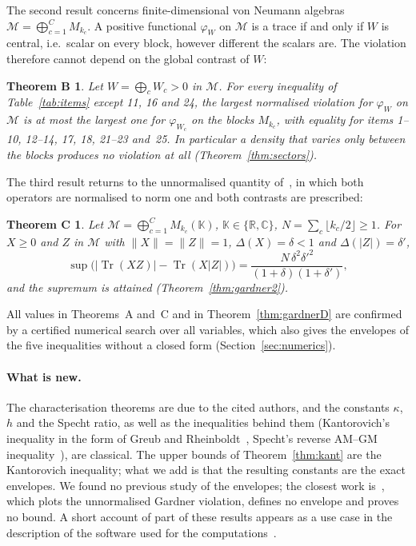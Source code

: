 \documentclass[11pt]{article}
\DeclareMathOperator{\Tr}{Tr}
\newcommand{\C}{\mathbb{C}}
\newcommand{\R}{\mathbb{R}}
\newcommand{\M}{\mathcal{M}}
\theoremstyle{plain}
\newtheorem*{thmB}{Theorem B}
\newtheorem*{thmC}{Theorem C}
\theoremstyle{definition}
\theoremstyle{remark}
\begin{document}
The second result concerns finite-dimensional von Neumann algebras $\M=\bigoplus_{c=1}^CM_{k_c}$. A positive functional
$\varphi_W$ on $\M$ is a trace if and only if $W$ is central, i.e.\ scalar on every block, however different the
scalars are. The violation therefore cannot depend on the global contrast of $W$:

\begin{thmB}
Let $W=\bigoplus_cW_c>0$ in $\M$. For every inequality of Table~\ref{tab:items} except 11, 16 and 24, the largest
normalised violation for $\varphi_W$ on $\M$ is at most the largest one for $\varphi_{W_c}$ on the blocks $M_{k_c}$, with
equality for items 1--10, 12--14, 17, 18, 21--23 and~25. In particular a density that varies only between the blocks
produces no violation at all (Theorem~\ref{thm:sectors}).
\end{thmB}

The third result returns to the unnormalised quantity of~\cite{abed2024}, in which both operators are normalised to
norm one and both contrasts are prescribed:

\begin{thmC}
Let $\M=\bigoplus_{c=1}^CM_{k_c}(\mathbb K)$, $\mathbb K\in\{\R,\C\}$, $N=\sum_c\lfloor k_c/2\rfloor\ge1$. For $X\ge0$
and $Z$ in $\M$ with $\|X\|=\|Z\|=1$, $\Delta(X)=\delta<1$ and $\Delta(|Z|)=\delta'$,
\[
  \sup\bigl(|\Tr(XZ)|-\Tr(X|Z|)\bigr)=\frac{N\,\delta^2\delta'^2}{(1+\delta)(1+\delta')},
\]
and the supremum is attained (Theorem~\ref{thm:gardner2}).
\end{thmC}

All values in Theorems~A and~C and in Theorem~\ref{thm:gardnerD} are confirmed by a certified numerical search over all
variables, which also gives the envelopes of the five inequalities without a closed form (Section~\ref{sec:numerics}).

\paragraph{What is new.} The characterisation theorems are due to the cited authors, and the constants $\kappa$, $h$
and the Specht ratio, as well as the inequalities behind them (Kantorovich's inequality in the form of Greub and
Rheinboldt~\cite{greub1959,furuta2005}, Specht's reverse AM--GM inequality~\cite{specht1960}), are classical. The upper
bounds of Theorem~\ref{thm:kant} are the Kantorovich inequality; what we add is that the resulting constants are the
exact envelopes. We found no previous study of the envelopes; the closest work is~\cite{abed2024}, which plots
the unnormalised Gardner violation, defines no envelope and proves no bound. A short account of part of these results
appears as a use case in the description of the software used for the computations~\cite{lib}.
\end{document}
